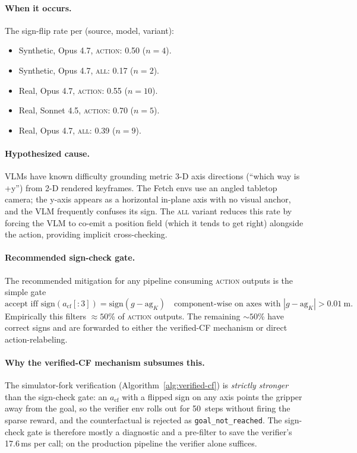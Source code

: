 \paragraph{When it occurs.}
The sign-flip rate per (source, model, variant):

\begin{itemize}\itemsep0pt
\item Synthetic, Opus 4.7, \textsc{action}: 0.50 ($n\!=\!4$).
\item Synthetic, Opus 4.7, \textsc{all}: 0.17 ($n\!=\!2$).
\item Real, Opus 4.7, \textsc{action}: 0.55 ($n\!=\!10$).
\item Real, Sonnet 4.5, \textsc{action}: 0.70 ($n\!=\!5$).
\item Real, Opus 4.7, \textsc{all}: 0.39 ($n\!=\!9$).
\end{itemize}

\paragraph{Hypothesized cause.}
VLMs have known difficulty grounding metric 3-D axis directions
(``which way is +y'') from 2-D rendered keyframes. The Fetch envs use
an angled tabletop camera; the y-axis appears as a horizontal
in-plane axis with no visual anchor, and the VLM frequently confuses
its sign. The \textsc{all} variant reduces this rate by forcing the VLM
to co-emit a position field (which it tends to get right) alongside
the action, providing implicit cross-checking.

\paragraph{Recommended sign-check gate.}
The recommended mitigation for any pipeline consuming \textsc{action}
outputs is the simple gate
\begin{equation}
\text{accept iff } \mathrm{sign}(a_{\text{cf}}[:\!3]) = \mathrm{sign}(g - \text{ag}_K)
\quad \text{component-wise on axes with } |g - \text{ag}_K| > 0.01~\mathrm{m}.
\label{eq:sign-gate}
\end{equation}
Empirically this filters $\approx 50$\% of \textsc{action} outputs.
The remaining $\sim\!50$\% have correct signs and are forwarded to
either the verified-CF mechanism or direct action-relabeling.

\paragraph{Why the verified-CF mechanism subsumes this.}
The simulator-fork verification (Algorithm~\ref{alg:verified-cf}) is
\emph{strictly stronger} than the sign-check gate: an
$a_{\text{cf}}$ with a flipped sign on any axis points the gripper
away from the goal, so the verifier env rolls out for 50~steps without
firing the sparse reward, and the counterfactual is rejected as
\texttt{goal\_not\_reached}. The sign-check gate is therefore mostly a
diagnostic and a pre-filter to save the verifier's 17.6\,ms per call;
on the production pipeline the verifier alone suffices.

